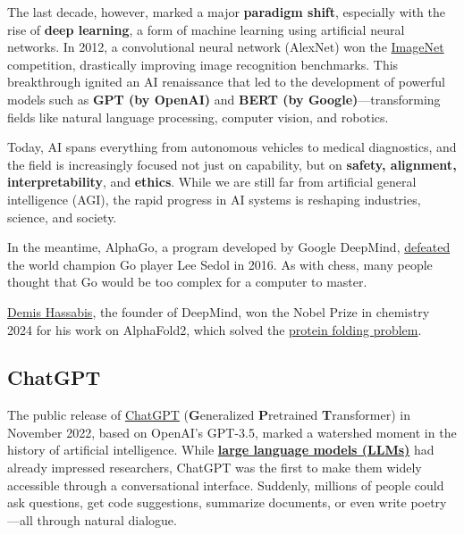 \documentclass[
]{book}
\begin{document}
The last decade, however, marked a major \textbf{paradigm shift}, especially with
the rise of \textbf{deep learning}, a form of machine learning using artificial
neural networks. In 2012, a convolutional neural network (AlexNet) won the
\href{https://www.image-net.org/challenges/LSVRC/}{ImageNet} competition,
drastically improving image recognition benchmarks.
This breakthrough ignited an AI renaissance that led to the development
of powerful models such as \textbf{GPT (by OpenAI)} and \textbf{BERT (by Google)}---transforming
fields like natural language processing, computer vision, and robotics.

Today, AI spans everything from autonomous vehicles to medical diagnostics,
and the field is increasingly focused not just on capability,
but on \textbf{safety, alignment, interpretability}, and \textbf{ethics}.
While we are still far from artificial general intelligence (AGI),
the rapid progress in AI systems is reshaping industries, science, and society.

In the meantime, AlphaGo, a program developed by Google DeepMind,
\href{https://de.wikipedia.org/wiki/AlphaGo_gegen_Lee_Sedol}{defeated}
the world champion Go player Lee Sedol in 2016. As with chess,
many people thought that Go would be too complex for a computer to master.

\href{https://www.nobelprize.org/prizes/chemistry/2024/hassabis/facts/}{Demis Hassabis},
the founder of DeepMind,
won the Nobel Prize in chemistry 2024 for his work on AlphaFold2, which
solved the \href{https://pmc.ncbi.nlm.nih.gov/articles/PMC2443096/\#:~:text=The\%20protein\%20folding\%20problem\%20is,first\%20atomic\%2Dresolution\%20protein\%20structures.}{protein folding problem}.

\subsection{ChatGPT}\label{chatgpt}

The public release of \href{https://openai.com/index/chatgpt/}{ChatGPT}
(\textbf{G}eneralized \textbf{P}retrained \textbf{T}ransformer) in November 2022, based on OpenAI's GPT-3.5,
marked a watershed moment in the history of artificial intelligence.
While \href{https://en.wikipedia.org/wiki/Large_language_model}{\textbf{large language models (LLMs)}}
had already impressed researchers,
ChatGPT was the first to make them widely accessible through a conversational interface.
Suddenly, millions of people could ask questions,
get code suggestions, summarize documents, or even write poetry---all through natural dialogue.
\end{document}
